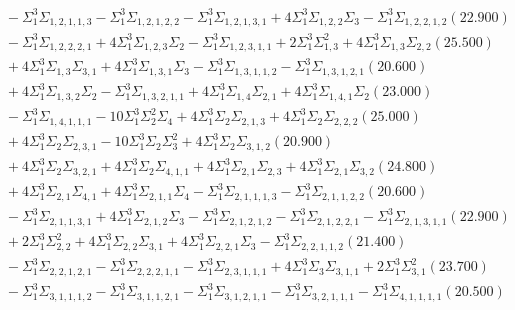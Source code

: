 \documentclass[12pt]{article}
\begin{document}
\begin{landscape}
\begin{align*}
		&\quad\quad -\Sigma_{1}^{3}\Sigma_{1,2,1,1,3}-\Sigma_{1}^{3}\Sigma_{1,2,1,2,2}-\Sigma_{1}^{3}\Sigma_{1,2,1,3,1}+4\Sigma_{1}^{3}\Sigma_{1,2,2}\Sigma_{3}-\Sigma_{1}^{3}\Sigma_{1,2,2,1,2}(22.900) \\ 
		&\quad\quad -\Sigma_{1}^{3}\Sigma_{1,2,2,2,1}+4\Sigma_{1}^{3}\Sigma_{1,2,3}\Sigma_{2}-\Sigma_{1}^{3}\Sigma_{1,2,3,1,1}+2\Sigma_{1}^{3}\Sigma_{1,3}^{2}+4\Sigma_{1}^{3}\Sigma_{1,3}\Sigma_{2,2}(25.500) \\ 
		&\quad\quad +4\Sigma_{1}^{3}\Sigma_{1,3}\Sigma_{3,1}+4\Sigma_{1}^{3}\Sigma_{1,3,1}\Sigma_{3}-\Sigma_{1}^{3}\Sigma_{1,3,1,1,2}-\Sigma_{1}^{3}\Sigma_{1,3,1,2,1}(20.600) \\ 
		&\quad\quad +4\Sigma_{1}^{3}\Sigma_{1,3,2}\Sigma_{2}-\Sigma_{1}^{3}\Sigma_{1,3,2,1,1}+4\Sigma_{1}^{3}\Sigma_{1,4}\Sigma_{2,1}+4\Sigma_{1}^{3}\Sigma_{1,4,1}\Sigma_{2}(23.000) \\ 
		&\quad\quad -\Sigma_{1}^{3}\Sigma_{1,4,1,1,1}-10\Sigma_{1}^{3}\Sigma_{2}^{2}\Sigma_{4}+4\Sigma_{1}^{3}\Sigma_{2}\Sigma_{2,1,3}+4\Sigma_{1}^{3}\Sigma_{2}\Sigma_{2,2,2}(25.000) \\ 
		&\quad\quad +4\Sigma_{1}^{3}\Sigma_{2}\Sigma_{2,3,1}-10\Sigma_{1}^{3}\Sigma_{2}\Sigma_{3}^{2}+4\Sigma_{1}^{3}\Sigma_{2}\Sigma_{3,1,2}(20.900) \\ 
		&\quad\quad +4\Sigma_{1}^{3}\Sigma_{2}\Sigma_{3,2,1}+4\Sigma_{1}^{3}\Sigma_{2}\Sigma_{4,1,1}+4\Sigma_{1}^{3}\Sigma_{2,1}\Sigma_{2,3}+4\Sigma_{1}^{3}\Sigma_{2,1}\Sigma_{3,2}(24.800) \\ 
		&\quad\quad +4\Sigma_{1}^{3}\Sigma_{2,1}\Sigma_{4,1}+4\Sigma_{1}^{3}\Sigma_{2,1,1}\Sigma_{4}-\Sigma_{1}^{3}\Sigma_{2,1,1,1,3}-\Sigma_{1}^{3}\Sigma_{2,1,1,2,2}(20.600) \\ 
		&\quad\quad -\Sigma_{1}^{3}\Sigma_{2,1,1,3,1}+4\Sigma_{1}^{3}\Sigma_{2,1,2}\Sigma_{3}-\Sigma_{1}^{3}\Sigma_{2,1,2,1,2}-\Sigma_{1}^{3}\Sigma_{2,1,2,2,1}-\Sigma_{1}^{3}\Sigma_{2,1,3,1,1}(22.900) \\ 
		&\quad\quad +2\Sigma_{1}^{3}\Sigma_{2,2}^{2}+4\Sigma_{1}^{3}\Sigma_{2,2}\Sigma_{3,1}+4\Sigma_{1}^{3}\Sigma_{2,2,1}\Sigma_{3}-\Sigma_{1}^{3}\Sigma_{2,2,1,1,2}(21.400) \\ 
		&\quad\quad -\Sigma_{1}^{3}\Sigma_{2,2,1,2,1}-\Sigma_{1}^{3}\Sigma_{2,2,2,1,1}-\Sigma_{1}^{3}\Sigma_{2,3,1,1,1}+4\Sigma_{1}^{3}\Sigma_{3}\Sigma_{3,1,1}+2\Sigma_{1}^{3}\Sigma_{3,1}^{2}(23.700) \\ 
		&\quad\quad -\Sigma_{1}^{3}\Sigma_{3,1,1,1,2}-\Sigma_{1}^{3}\Sigma_{3,1,1,2,1}-\Sigma_{1}^{3}\Sigma_{3,1,2,1,1}-\Sigma_{1}^{3}\Sigma_{3,2,1,1,1}-\Sigma_{1}^{3}\Sigma_{4,1,1,1,1}(20.500) \\ 

\end{align*}
\end{landscape}
\end{document}

